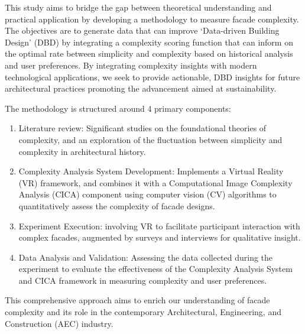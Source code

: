 This study aims to bridge the gap between theoretical understanding and practical application by developing a methodology to measure facade complexity.
The objectives are to generate data that can improve `Data-driven Building Design' (DBD) by integrating a complexity scoring function that can inform on the optimal rate between simplicity and complexity based on historical analysis and user preferences.
By integrating complexity insights with modern technological applications, we seek to provide actionable, DBD insights for future architectural practices promoting the advancement aimed at sustainability.

The methodology is structured around 4 primary components:

\begin{enumerate}
    \item Literature review: Significant studies on the foundational theories of complexity, and an exploration of the fluctuation between simplicity and complexity in architectural history.
    \item Complexity Analysis System Development: Implements a Virtual Reality (VR) framework, and combines it with a Computational Image Complexity Analysis (CICA) component using computer vision (CV) algorithms to quantitatively assess the complexity of facade designs.
    \item Experiment Execution: involving VR to facilitate participant interaction with complex facades, augmented by surveys and interviews for qualitative insight.
    \item Data Analysis and Validation: Assessing the data collected during the experiment to evaluate the effectiveness of the Complexity Analysis System and CICA framework in measuring complexity and user preferences.
\end{enumerate}

This comprehensive approach aims to enrich our understanding of facade complexity and its role in the contemporary Architectural, Engineering, and Construction (AEC) industry.

%
